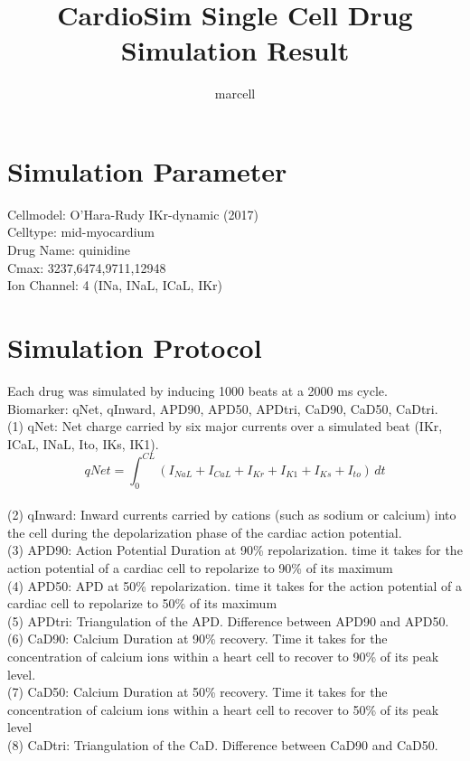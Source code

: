 \documentclass[11pt]{article}
\title{CardioSim Single Cell Drug Simulation Result}
\author{marcell}
\begin{document}
\maketitle
\section*{Simulation Parameter}
Cellmodel: O'Hara-Rudy IKr-dynamic (2017)
\\Celltype: mid-myocardium
\\Drug Name: quinidine
\\Cmax: 3237,6474,9711,12948
\\Ion Channel: 4 (INa, INaL, ICaL, IKr)
\section*{Simulation Protocol}
Each drug was simulated by inducing 1000 beats at a 2000 ms cycle.
\\Biomarker: qNet, qInward, APD90, APD50, APDtri, CaD90, CaD50, CaDtri.
\\(1) qNet: Net charge carried by six major currents over a simulated beat (IKr, ICaL, INaL, Ito, IKs, IK1).
\begin{equation}
	 qNet = \int_{0}^{CL} (I_{NaL} + I_{CaL} + I_{Kr} + I_{K1} + I_{Ks} + I_{to}) \,dt
	 \label{qnet}
\end{equation}
\\(2) qInward: Inward currents carried by cations (such as sodium or calcium) into the cell during the depolarization phase of the cardiac action potential.
\\(3) APD90: Action Potential Duration at 90\% repolarization. time it takes for the action potential of a cardiac cell to repolarize to 90\% of its maximum
\\(4) APD50: APD at 50\% repolarization. time it takes for the action potential of a cardiac cell to repolarize to 50\% of its maximum
\\(5)  APDtri: Triangulation of the APD. Difference between APD90 and APD50. 
\\(6)  CaD90: Calcium Duration at 90\% recovery. Time it takes for the concentration of calcium ions within a heart cell to recover to 90\% of its peak level.
\\(7)  CaD50: Calcium Duration at 50\% recovery. Time it takes for the concentration of calcium ions within a heart cell to recover to 50\% of its peak level
\\(8)  CaDtri: Triangulation of the CaD. Difference between CaD90 and CaD50.
\end{document}
